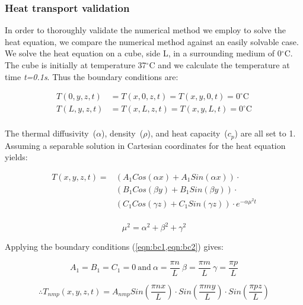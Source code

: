 \subsubsection{Heat transport validation}

In order to thoroughly validate the numerical method we employ to solve the heat equation, we compare the numerical method against an easily solvable case. We solve the heat equation on a cube, side L, in a surrounding medium of 0$^{\circ}$C. The cube is initially at temperature 37$^{\circ}$C and we calculate the temperature at time \textit{t=0.1s}. Thus the boundary conditions are:

\begin{align}
T(0,y,z,t)&=T(x,0,z,t)=T(x,y,0,t)=0^{\circ}\text{C} \label{eqn:bc1}\\
T(L,y,z,t)&=T(x,L,z,t)=T(x,y,L,t)=0^{\circ}\text{C} \label{eqn:bc2}\\
\end{align}

The thermal diffusivity~($\alpha$), density~($\rho$), and heat capacity~($c_p$) are all set to 1. Assuming a separable solution in Cartesian coordinates for the heat equation yields:

\begin{equation}
\begin{split}
T(x,y,z,t)=&(A_1Cos(\alpha x) + A_1Sin(\alpha x))\cdot\\
&(B_1Cos(\beta y) + B_1Sin(\beta y))\cdot\\
&(C_1Cos(\gamma z) + C_1Sin(\gamma z))\cdot e^{-\alpha\mu^2t}\\
\end{split} 
\end{equation}

\begin{equation}
\mu^2=\alpha^2+\beta^2+\gamma^2
\end{equation}

Applying the boundary conditions (\cref{eqn:bc1,eqn:bc2}) gives:

\begin{equation}
A_1=B_1=C_1=0\
\text{and}\ \alpha=\frac{\pi n}{L}\ \beta=\frac{\pi m}{L}\ \gamma=\frac{\pi p}{L}
\end{equation}

\begin{equation}
\therefore  T_{nmp}(x,y,z,t)=A_{nmp}Sin\left(\frac{\pi n x}{L}\right)\cdot Sin\left(\frac{\pi m y}{L}\right)\cdot Sin\left(\frac{\pi p z}{L}\right)
\end{equation}

